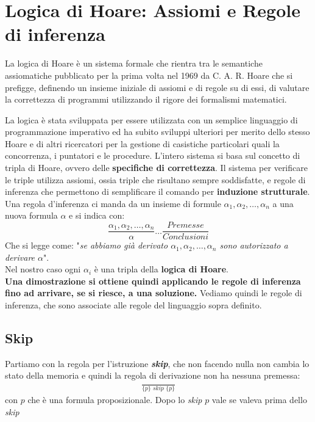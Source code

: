 \section{Logica di Hoare: Assiomi e Regole di inferenza}
La logica di Hoare è un sistema formale che rientra tra le semantiche assiomatiche pubblicato per la prima volta nel 1969 da C. A. R. Hoare che si prefigge, definendo un insieme iniziale di assiomi e di regole su di essi, di valutare la correttezza di programmi utilizzando il rigore dei formalismi matematici.

La logica è stata sviluppata per essere utilizzata con un semplice linguaggio di programmazione imperativo ed ha subito sviluppi ulteriori per merito dello stesso Hoare e di altri ricercatori per la gestione di casistiche particolari quali la concorrenza, i puntatori e le procedure. 
L'intero sistema si basa sul concetto di tripla di Hoare, ovvero delle\textbf{ specifiche di correttezza}.
Il sistema per verificare le triple utilizza assiomi, ossia triple che risultano sempre soddisfatte, e regole di inferenza che permettono di semplificare il comando per \textbf{induzione strutturale}. 
Una regola d'inferenza ci manda da un insieme di formule
$\alpha_1,\alpha_2,\ldots,\alpha_n$ a una nuova formula $\alpha$ e si indica
con: 
\[\frac{\alpha_1,\alpha_2,\ldots,\alpha_n}{\alpha} \dots \frac{Premesse}{Conclusioni}\]
Che si legge come: "\textit{se abbiamo già derivato $\alpha_1, \alpha_2,
	\ldots,\alpha_n$ sono autorizzato a derivare $\alpha$}".\\ 
Nel nostro caso ogni $\alpha_i$ è una tripla della \textbf{logica di Hoare}.\\
\textbf{Una dimostrazione si ottiene quindi applicando le regole di inferenza fino
ad arrivare, se si riesce, a una soluzione.}
Vediamo quindi le regole di inferenza, che sono associate alle regole del
linguaggio sopra definito.
\subsection{Skip}
\begin{definizione}
	Partiamo con la regola per l'istruzione \textbf{\textit{skip}}, che non
	facendo nulla 
	non cambia lo stato della memoria e quindi la regola di derivazione non ha
	nessuna premessa:
	\begin{align}\label{SkipRule}
		\frac{}{\{p\}\,\, skip\,\,\{p\}} 
	\end{align}
	con $p$ che è una formula proposizionale. Dopo lo \textit{skip} $p$ vale se
	valeva prima dello \textit{skip}
\end{definizione} \vspace{5mm} %
